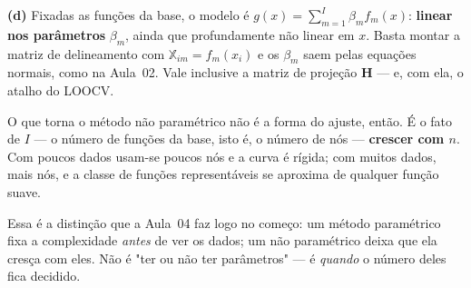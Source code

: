 \begin{solucao}
\smallskip
\textbf{(d)} Fixadas as funções da base, o modelo é
$g(x)=\sum_{m=1}^{I}\beta_m f_m(x)$: \textbf{linear nos parâmetros} $\beta_m$,
ainda que profundamente não linear em $x$. Basta montar a matriz de delineamento
com $\mathbb{X}_{im}=f_m(x_i)$ e os $\beta_m$ saem pelas equações normais, como na
Aula~02. Vale inclusive a matriz de projeção $\bm H$ --- e, com ela, o atalho do
LOOCV.

O que torna o método não paramétrico não é a forma do ajuste, então. É o fato de
$I$ --- o número de funções da base, isto é, o número de nós --- \textbf{crescer
com $n$}. Com poucos dados usam-se poucos nós e a curva é rígida; com muitos
dados, mais nós, e a classe de funções representáveis se aproxima de qualquer
função suave.

Essa é a distinção que a Aula~04 faz logo no começo: um método paramétrico fixa a
complexidade \emph{antes} de ver os dados; um não paramétrico deixa que ela cresça
com eles. Não é "ter ou não ter parâmetros" --- é \emph{quando} o número deles
fica decidido.
\end{solucao}
